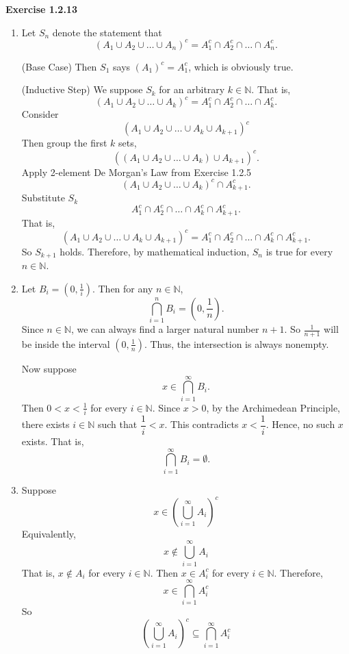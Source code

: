 \documentclass[12pt]{article}
\begin{document}
\noindent{} \textbf{Exercise 1.2.13}
\begin{enumerate}
      \item [(a)] Let $S_n$ denote the statement that
            \[
                  (A_1 \cup A_2 \cup \dots \cup A_n)^c = A_1^c \cap A_2^c \cap \dots \cap A_n^c.
            \]

            (Base Case) Then $S_1$ says $(A_1)^c = A_1^c$, which is obviously true.

            (Inductive Step) We suppose $S_k$ for an arbitrary $k \in \mathbb{N}$. That is,
            \[
                  (A_1 \cup A_2 \cup \dots \cup A_k)^c = A_1^c \cap A_2^c \cap \dots \cap A_k^c.
            \]
            Consider
            \[
                  (A_1 \cup A_2 \cup \dots \cup A_k \cup A_{k+1})^c
            \]
            Then group the first $k$ sets,
            \[
                  ((A_1 \cup A_2 \cup \dots \cup A_k)\cup A_{k+1})^c.
            \]
            Apply 2-element De Morgan's Law from Exercise 1.2.5
            \[
                  (A_1 \cup A_2 \cup \dots \cup A_k)^c \cap A_{k+1}^c.
            \]
            Substitute $S_k$
            \[
                  A_1^c \cap A_2^c \cap \dots \cap A_k^c \cap A_{k+1}^c.
            \]
            That is,
            \[
                  (A_1 \cup A_2 \cup \dots \cup A_k \cup A_{k+1})^c = A_1^c \cap A_2^c \cap \dots \cap A_k^c \cap A_{k+1}^c.
            \]
            So $S_{k+1}$ holds. Therefore, by mathematical induction, $S_n$ is true for every $n \in \mathbb{N}$.
      \item [(b)]
            Let $B_i = (0, \frac{1}{i})$. Then for any $n \in \mathbb{N}$,
            \[
                  \bigcap_{i=1}^{n} B_i = (0, \frac{1}{n}).
            \]
            Since $n \in \mathbb{N}$, we can always
            find a larger natural number $n+1$.
            So $\frac{1}{n+1}$ will be inside the interval $(0, \frac{1}{n})$.
            Thus, the intersection is always nonempty.

            Now suppose
            \[
                  x \in \bigcap_{i=1}^{\infty} B_i.
            \]
            Then $ 0 < x < \frac{1}{i}$ for every $i \in \mathbb{N}$.
            Since $x > 0$, by the Archimedean Principle,
            there exists $i \in \mathbb{N}$ such that $\dfrac{1}{i} < x$.
            This contradicts $x < \dfrac{1}{i}$.
            Hence, no such $x$ exists.
            That is,
            \[
                  \bigcap_{i=1}^{\infty} B_i = \emptyset.
            \]
      \item [(c)]
            Suppose
            \[
                  x \in \left(\bigcup_{i=1}^{\infty} A_i\right)^c
            \]
            Equivalently,
            \[
                  x \notin \bigcup_{i=1}^{\infty} A_i
            \]
            That is, $x \notin A_i$ for every $ i \in \mathbb{N}$.
            Then $x \in A_i^c$ for every $ i \in \mathbb{N}$.
            Therefore,
            \[
                  x \in \bigcap_{i=1}^{\infty} A_i^c
            \]
            So
            \[
                  \left(\bigcup_{i=1}^{\infty} A_i\right)^c \subseteq \bigcap_{i=1}^{\infty} A_i^c
            \]


\end{enumerate}
\end{document}
